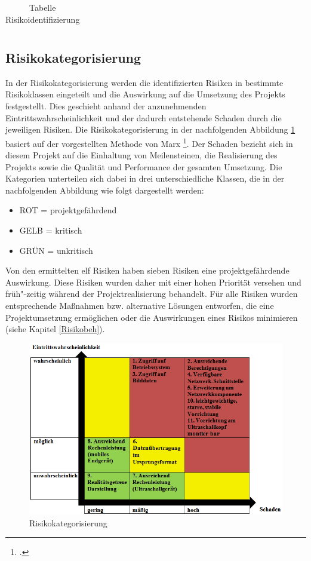 \begin{center}
\begin{table} [H]
\begin{tabular}{ | p{} | p{} | p{} |}
    \end{tabular}
     \caption{{\small Tabelle Risikoidentifizierung}}
     \label{tab:Risikoidentifizierung}
    \end{table}
\end{center}

\subsection{Risikokategorisierung}
In der Risikokategorisierung werden die identifizierten Risiken in bestimmte Risikoklassen eingeteilt und die Auswirkung auf die Umsetzung des Projekts festgestellt. Dies geschieht anhand der anzunehmenden Eintrittswahrscheinlichkeit und der dadurch entstehende Schaden durch die jeweiligen Risiken. Die Risikokategorisierung in der nachfolgenden Abbildung \ref{fig:risikokategorisierung} basiert auf der vorgestellten Methode von Marx \footcite{Risikomanagement}. Der Schaden bezieht sich in diesem Projekt auf die Einhaltung von Meilensteinen, die Realisierung des Projekts sowie die Qualität und Performance der gesamten Umsetzung. Die Kategorien unterteilen sich dabei in drei unterschiedliche Klassen, die in der nachfolgenden Abbildung wie folgt dargestellt werden:
\begin{itemize}
\item ROT  = projektgefährdend
\item GELB = kritisch
\item GRÜN = unkritisch
\end{itemize}
Von den ermittelten elf Risiken haben sieben Risiken eine projektgefährdende Auswirkung. Diese Risiken wurden daher mit einer hohen Priorität versehen und früh"-zeitig während der Projektrealisierung behandelt. Für alle Risiken wurden entsprechende Maßnahmen bzw. alternative Lösungen entworfen, die eine Projektumsetzung ermöglichen oder die Auswirkungen eines Risikos minimieren (siehe Kapitel \ref{Risikobeh}). 
\begin{figure}[H]
	\centering
	\includegraphics[width=1\textwidth]{Bilder/Risiko_und_Anforderungsanalyse/Risikokategorisierung.png}
	\caption{Risikokategorisierung}
	\label{fig:risikokategorisierung}
\end{figure}

